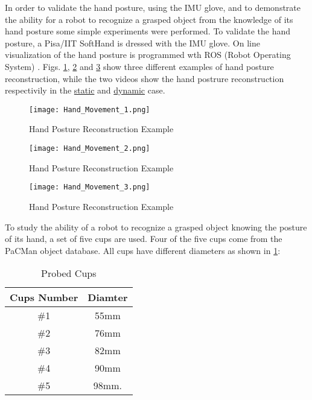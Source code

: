 In order to validate the hand posture, using the IMU glove, and to demonstrate the ability for a robot to recognize a grasped object from the knowledge of its hand posture some simple experiments were performed.
To validate the hand posture, a Pisa/IIT SoftHand is dressed with the IMU glove. On line visualization of the hand posture is programmed wth ROS (Robot Operating System) \cite{riferimento}. Figs. \ref{fig:hand_reconstruction_1}, \ref{fig:hand_reconstruction_2} and \ref{fig:hand_reconstruction_3} show three different examples of hand posture reconstruction, while the two videos show the hand postrure reconstruction respectivily in the \href{https://www.youtube.com/watch?v=0oVha0Q1vWM}{static} and \href{https://www.youtube.com/watch?v=bceOXa990-Q}{dynamic} case.

\begin{figure}[h]
\centering
\texttt{[image: Hand\_Movement\_1.png]}
\caption{Hand Posture Reconstruction Example}
\label{fig:hand_reconstruction_1}
\end{figure} 

\begin{figure}[h]
\centering
\texttt{[image: Hand\_Movement\_2.png]}
\caption{Hand Posture Reconstruction Example}
\label{fig:hand_reconstruction_2}
\end{figure} 

\begin{figure}[h]
\centering
\texttt{[image: Hand\_Movement\_3.png]}
\caption{Hand Posture Reconstruction Example}
\label{fig:hand_reconstruction_3}
\end{figure} 

To study the ability of a robot to recognize a grasped object knowing the posture of its hand, a set of five cups are used. Four of the five cups come from the PaCMan object database. All cups have different diameters as shown in \ref{tab:cups}:

\begin{table}[tb]\footnotesize
\begin{tabular}{cc} \hline \hline
Cups Number & Diamter \\ \hline
\#1 & 55mm \\
\#2 & 76mm \\
\#3 & 82mm \\
\#4 & 90mm \\
\#5 & 98mm.
\end{tabular}
\caption{Probed Cups}
\label{tab:cups}
\end{table}

